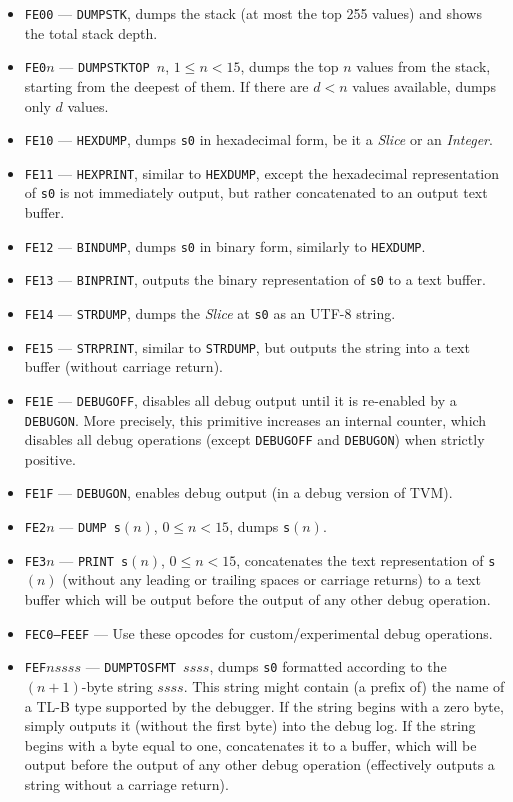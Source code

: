 \documentclass[12pt,oneside]{article}
\begin{document}
\begin{itemize}
\item {\tt FE00} --- {\tt DUMPSTK}, dumps the stack (at most the top 255 values) and shows the total stack depth.
\item {\tt FE0$n$} --- {\tt DUMPSTKTOP $n$}, $1\leq n<15$, dumps the top $n$ values from the stack, starting from the deepest of them. If there are $d<n$ values available, dumps only $d$ values.
\item {\tt FE10} --- {\tt HEXDUMP}, dumps {\tt s0} in hexadecimal form, be it a {\em Slice} or an {\em Integer}.
\item {\tt FE11} --- {\tt HEXPRINT}, similar to {\tt HEXDUMP}, except the hexadecimal representation of {\tt s0} is not immediately output, but rather concatenated to an output text buffer.
\item {\tt FE12} --- {\tt BINDUMP}, dumps {\tt s0} in binary form, similarly to {\tt HEXDUMP}.
\item {\tt FE13} --- {\tt BINPRINT}, outputs the binary representation of {\tt s0} to a text buffer.
\item {\tt FE14} --- {\tt STRDUMP}, dumps the {\em Slice} at {\tt s0} as an UTF-8 string.
\item {\tt FE15} --- {\tt STRPRINT}, similar to {\tt STRDUMP}, but outputs the string into a text buffer (without carriage return).
\item {\tt FE1E} --- {\tt DEBUGOFF}, disables all debug output until it is re-enabled by a {\tt DEBUGON}. More precisely, this primitive increases an internal counter, which disables all debug operations (except {\tt DEBUGOFF} and {\tt DEBUGON}) when strictly positive.
\item {\tt FE1F} --- {\tt DEBUGON}, enables debug output (in a debug version of TVM).
\item {\tt FE2$n$} --- {\tt DUMP s$(n)$}, $0\leq n<15$, dumps {\tt s}$(n)$.
\item {\tt FE3$n$} --- {\tt PRINT s$(n)$}, $0\leq n<15$, concatenates the text representation of {\tt s}$(n)$ (without any leading or trailing spaces or carriage returns) to a text buffer which will be output before the output of any other debug operation.
\item {\tt FEC0--FEEF} --- Use these opcodes for custom/experimental debug operations.
\item {\tt FEF$nssss$} --- {\tt DUMPTOSFMT $ssss$}, dumps {\tt s0} formatted according to the $(n+1)$-byte string $ssss$. This string might contain (a prefix of) the name of a TL-B type supported by the debugger. If the string begins with a zero byte, simply outputs it (without the first byte) into the debug log. If the string begins with a byte equal to one, concatenates it to a buffer, which will be output before the output of any other debug operation (effectively outputs a string without a carriage return).

\end{itemize}
\end{document}
